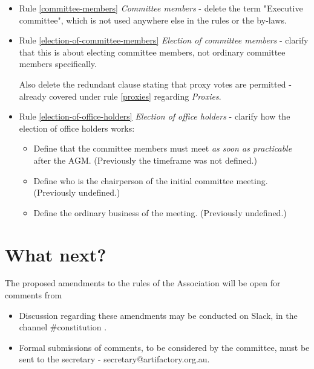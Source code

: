 \documentclass[../constitution.tex]{subfiles}
\begin{document}
\begin{itemize}


\item Rule \ref{committee-members} \textit{Committee members} - delete the term "Executive committee", which is not used anywhere else in the rules or the by-laws.

\item Rule \ref{election-of-committee-members} \textit{Election of committee members} - clarify that this is about electing committee members, not ordinary committee members specifically.

Also delete the redundant clause stating that proxy votes are permitted - already covered under rule \ref{proxies} regarding \textit{Proxies}.

\item Rule \ref{election-of-office-holders} \textit{Election of office holders} - clarify how the election of office holders works:

  \begin{itemize}
  \item Define that the committee members must meet \textit{as soon as practicable} after the AGM. (Previously the timeframe was not defined.)
  \item Define who is the chairperson of the initial committee meeting. (Previously undefined.)
  \item Define the ordinary business of the meeting. (Previously undefined.)
  \end{itemize}

\end{itemize}

\section*{What next?}

The proposed amendments to the rules of the Association will be open for comments from 

\begin{itemize}
    \item Discussion regarding these amendments may be conducted on Slack, in the channel \#constitution .
    \item Formal submissions of comments, to be considered by the committee, must be sent to the secretary - secretary@artifactory.org.au.
\end{itemize}
\end{document}
